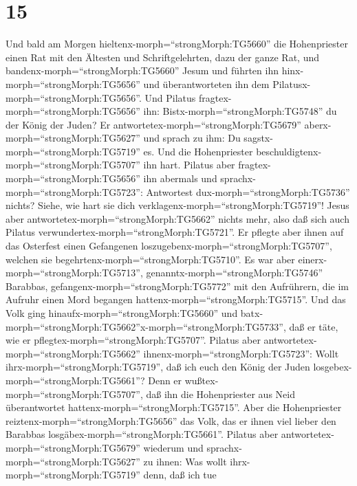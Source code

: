 \hypertarget{section-14}{%
\section{15}\label{section-14}}

 Und bald am Morgen hieltenx-morph=``strongMorph:TG5660''
die Hohenpriester einen Rat mit den Ältesten und Schriftgelehrten, dazu
der ganze Rat, und bandenx-morph=``strongMorph:TG5660'' Jesum und
führten ihn hinx-morph=``strongMorph:TG5656'' und überantworteten ihn
dem Pilatusx-morph=``strongMorph:TG5656''.  Und Pilatus
fragtex-morph=``strongMorph:TG5656'' ihn:
Bistx-morph=``strongMorph:TG5748'' du der König der Juden? Er
antwortetex-morph=``strongMorph:TG5679''
aberx-morph=``strongMorph:TG5627'' und sprach zu ihm: Du
sagstx-morph=``strongMorph:TG5719'' es.  Und die
Hohenpriester beschuldigtenx-morph=``strongMorph:TG5707'' ihn hart.
 Pilatus aber fragtex-morph=``strongMorph:TG5656'' ihn
abermals und sprachx-morph=``strongMorph:TG5723'': Antwortest
dux-morph=``strongMorph:TG5736'' nichts? Siehe, wie hart sie dich
verklagenx-morph=``strongMorph:TG5719''!  Jesus aber
antwortetex-morph=``strongMorph:TG5662'' nichts mehr, also daß sich auch
Pilatus verwundertex-morph=``strongMorph:TG5721''.  Er
pflegte aber ihnen auf das Osterfest einen Gefangenen
loszugebenx-morph=``strongMorph:TG5707'', welchen sie
begehrtenx-morph=``strongMorph:TG5710''.  Es war aber
einerx-morph=``strongMorph:TG5713'',
genanntx-morph=``strongMorph:TG5746'' Barabbas,
gefangenx-morph=``strongMorph:TG5772'' mit den Aufrührern, die im
Aufruhr einen Mord begangen hattenx-morph=``strongMorph:TG5715''.
 Und das Volk ging hinaufx-morph=``strongMorph:TG5660'' und
batx-morph=``strongMorph:TG5662''x-morph=``strongMorph:TG5733'', daß er
täte, wie er pflegtex-morph=``strongMorph:TG5707''.  Pilatus
aber antwortetex-morph=``strongMorph:TG5662''
ihnenx-morph=``strongMorph:TG5723'': Wollt
ihrx-morph=``strongMorph:TG5719'', daß ich euch den König der Juden
losgebex-morph=``strongMorph:TG5661''?  Denn er
wußtex-morph=``strongMorph:TG5707'', daß ihn die Hohenpriester aus Neid
überantwortet hattenx-morph=``strongMorph:TG5715''.  Aber
die Hohenpriester reiztenx-morph=``strongMorph:TG5656'' das Volk, das er
ihnen viel lieber den Barabbas losgäbex-morph=``strongMorph:TG5661''.
 Pilatus aber antwortetex-morph=``strongMorph:TG5679''
wiederum und sprachx-morph=``strongMorph:TG5627'' zu ihnen: Was wollt
ihrx-morph=``strongMorph:TG5719'' denn, daß ich tue
